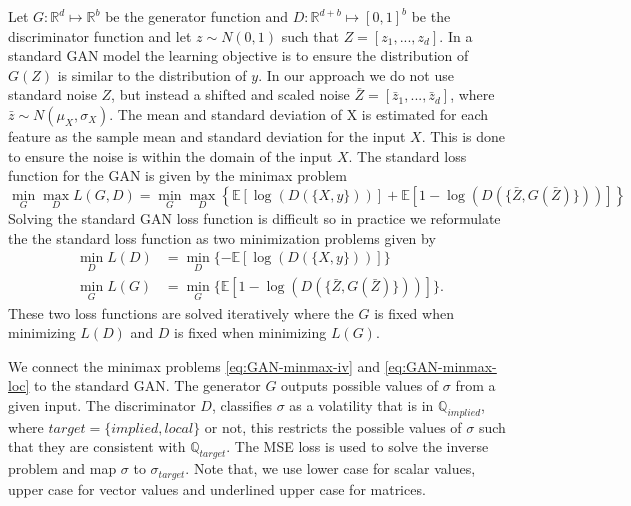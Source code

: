 \documentclass{article}
\theoremstyle{plain}%
\theoremstyle{definition}
\theoremstyle{remark}
\begin{document}
Let $G:\mathbb{R}^{d} \mapsto \mathbb{R}^{b}$ be the generator function and $D:\mathbb{R}^{d+b} \mapsto [0,1]^{b}$ be the discriminator function and let $z\sim N(0,1)$ such that $Z = [z_1,...,z_d]$. In a standard GAN model the learning objective is to ensure the distribution of $G(Z)$ is similar to the distribution of $y$. In our approach we do not use standard noise $Z$, but instead a shifted and scaled noise $\bar{Z} = [\bar{z}_1,...,\bar{z}_d]$, where $\bar{z}\sim N(\mu_X,\sigma_{X})$. The mean and standard deviation of X is estimated for each feature as the sample mean and standard deviation for the input $X$. This is done to ensure the noise is within the domain of  the input $X$. The standard loss function for the GAN is given by the minimax problem \citep{goodfellow-2016}
\begin{equation*}
	\min_{G}\max_{D} L(G,D) = \min_G\max_D \left\{\mathbb{E}[\log(D(\{X,y\}))] + \mathbb{E}[1-\log(D(\{\bar{Z},G(\bar{Z})\}))]\right\}
\end{equation*}
Solving the standard GAN loss function is difficult so in practice we reformulate the the standard loss function as two minimization problems given by
\begin{align*}
	\min_D L(D) &= \min_D  \{-\mathbb{E}[\log(D(\{X,y\}))]\}\\
    \min_G L(G) &= \min_G \{\mathbb{E}[1-\log(D(\{\bar{Z},G(\bar{Z})\}))]\}.
\end{align*}
These two loss functions are solved iteratively where the $G$ is fixed when minimizing $L(D)$ and $D$ is fixed when minimizing $L(G)$. 

We connect the minimax problems \eqref{eq:GAN-minmax-iv} and \eqref{eq:GAN-minmax-loc} to the standard GAN. The generator $G$ outputs possible values of $\sigma$ from a given input.  The discriminator $D$, classifies $\sigma$ as a volatility that is in $\mathbb{Q}_{implied}$, where $target = \{implied, local\}$
or not, this restricts the possible values of $\sigma$ such that they are consistent with $\mathbb{Q}_{target}$. The MSE loss is used to solve the inverse problem and map $\sigma$ to $\sigma_{target}$. Note that, we use lower case for scalar values, upper case for vector values and underlined upper case for matrices.
\end{document}
